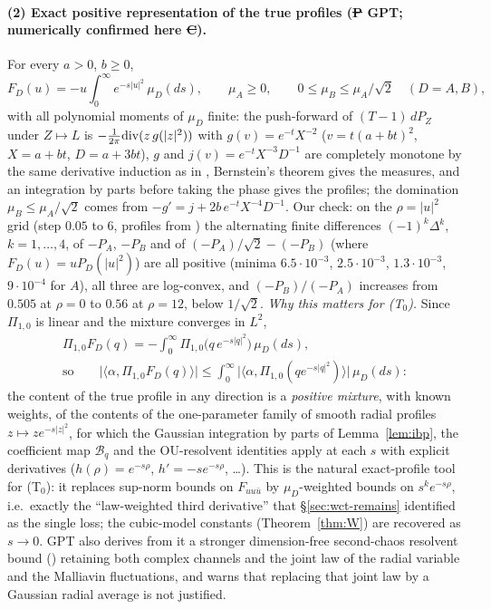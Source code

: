 \paragraph{(2) Exact positive representation of the true profiles (\st{P} GPT; numerically confirmed here \st{C}).} For every $a>0$, $b\ge0$,
\[
F_D(u)=-u\int_0^\infty e^{-s|u|^2}\,\mu_D(ds),\qquad \mu_A\ge0,\qquad 0\le\mu_B\le\mu_A/\sqrt2\quad(D=A,B),
\]
with all polynomial moments of $\mu_D$ finite: the push-forward of $(T-1)\,dP_Z$ under $Z\mapsto L$ is $-\frac1{2\pi}{\rm div}(z\,g(|z|^2))$ with $g(v)=e^{-t}X^{-2}$ ($v=t(a+bt)^2$,
$X=a+bt$, $D=a+3bt$), $g$ and $j(v)=e^{-t}X^{-3}D^{-1}$ are completely monotone by the same derivative induction as in , Bernstein's theorem gives the measures,
and an integration by parts before taking the phase gives the profiles; the domination $\mu_B\le\mu_A/\sqrt2$ comes from $-g'=j+2b\,e^{-t}X^{-4}D^{-1}$. Our check: on the $\rho=|u|^2$ grid
(step $0.05$ to $6$, profiles from ) the alternating finite differences $(-1)^k\Delta^k$, $k=1,\ldots,4$, of $-P_A$, $-P_B$ and of $(-P_A)/\sqrt2-(-P_B)$ (where $F_D(u)=uP_D(|u|^2)$) are
all positive (minima $6.5\cdot10^{-3}$, $2.5\cdot10^{-3}$, $1.3\cdot10^{-3}$, $9\cdot10^{-4}$ for $A$), all three are log-convex, and $(-P_B)/(-P_A)$ increases from $0.505$ at $\rho=0$ to $0.56$ at
$\rho=12$, below $1/\sqrt2$. \emph{Why this matters for (T$_0$).} Since $\Pi_{1,0}$ is linear and the mixture converges in $L^2$,
\[\begin{gathered}
\Pi_{1,0}F_D(q)=-\int_0^\infty\Pi_{1,0}\bigl(q\,e^{-s|q|^2}\bigr)\,\mu_D(ds),\\
\text{so}\qquad \bigl|\langle\alpha,\Pi_{1,0}F_D(q)\rangle\bigr|\le\int_0^\infty\bigl|\langle\alpha,\Pi_{1,0}(qe^{-s|q|^2})\rangle\bigr|\,\mu_D(ds):
\end{gathered}\]
the content of the true profile in any direction is a \emph{positive mixture}, with known weights, of the contents of the one-parameter family of smooth radial profiles $z\mapsto ze^{-s|z|^2}$,
for which the Gaussian integration by parts of Lemma~\ref{lem:ibp}, the coefficient map $\mathcal B_q$ and the OU-resolvent identities apply at each $s$ with explicit derivatives
($h(\rho)=e^{-s\rho}$, $h'=-se^{-s\rho}$, \dots). This is the natural exact-profile tool for (T$_0$): it replaces sup-norm bounds on $F_{uu\bar u}$ by $\mu_D$-weighted bounds on
$s^k e^{-s\rho}$, i.e.\ exactly the ``law-weighted third derivative'' that \S\ref{sec:wct-remains} identified as the single loss; the cubic-model constants (Theorem~\ref{thm:W}) are recovered
as $s\to0$. GPT also derives from it a stronger dimension-free second-chaos resolvent bound () retaining both complex channels and the joint law of
the radial variable and the Malliavin fluctuations, and warns that replacing that joint law by a Gaussian radial average is not justified.

